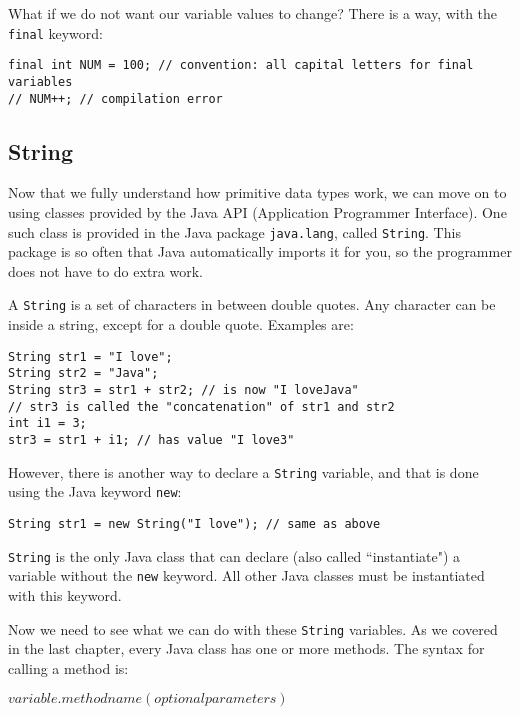 What if we do not want our variable values to change? There is a way, with the \verb|final| keyword:
\begin{lstlisting}
final int NUM = 100; // convention: all capital letters for final variables
// NUM++; // compilation error
\end{lstlisting}

\subsection{String}
Now that we fully understand how primitive data types work, we can move on to using classes provided by the Java API (Application Programmer Interface). One such class is provided in the Java package \verb|java.lang|, called \verb|String|. This package is so often that Java automatically imports it for you, so the programmer does not have to do extra work.

\par A \verb|String| is a set of characters in between double quotes. Any character can be inside a string, except for a double quote. Examples are:
\begin{lstlisting}
String str1 = "I love";
String str2 = "Java";
String str3 = str1 + str2; // is now "I loveJava"
// str3 is called the "concatenation" of str1 and str2
int i1 = 3;
str3 = str1 + i1; // has value "I love3"
\end{lstlisting}

\noindent However, there is another way to declare a \verb|String| variable, and that is done using the Java keyword \verb|new|:
\begin{lstlisting}
String str1 = new String("I love"); // same as above
\end{lstlisting}

\verb|String| is the only Java class that can declare (also called ``instantiate") a variable without the \verb|new| keyword. All other Java classes must be instantiated with this keyword.

\par Now we need to see what we can do with these \verb|String| variables. As we covered in the last chapter, every Java class has one or more methods. The syntax for calling a method is:

\begin{center}
$variable.methodname(optional parameters)$
\end{center}

